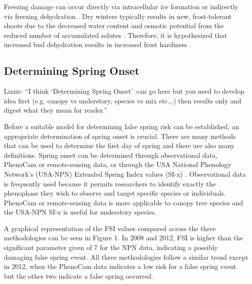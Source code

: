 \documentclass{article}\usepackage[]{graphicx}\usepackage[]{color}
\begin{document}
Freezing damage can occur directly via intracellular ice formation or indirectly via freezing dehydration \citep{Hofmann2015, Beck2004, Pearce2001}. Dry winters typically results in new, frost-tolerant shoots due to the decreased water content and osmotic potential from the reduced number of accumulated solutes \citep{Hofmann2015, Morin2007}. Therefore, it is hypothesized that increased bud dehydration results in increased frost hardiness \citep{Hofmann2015, Kathke2011, Poirier2010, Nielsen2009, Beck2007}.

\subsection*{Determining Spring Onset}
Lizzie: ``I think `Determining Spring Onset'\, can go here but you need to develop idea first (e.g. canopy vs understory, species vs mix etc...) then results only and digest what they mean for reader.''

Before a suitable model for determining false spring risk can be established, an appropriate determination of spring onset is crucial. There are many methods that can be used to determine the first day of spring and there are also many definitions. Spring onset can be determined through observational data, PhenoCam or remote-sensing data, or through the USA National Phenology Network's (USA-NPN) Extended Spring Index values (SI-x) \citep{USA-NPN2016}. Observational data is frequently used because it permits researchers to identify exactly the phenophase they wish to observe and target specific species or individuals. PhenoCam or remote-sensing data is more applicable to canopy tree species and the USA-NPN SI-x is useful for understory species.

A graphical representation of the FSI values compared across the three methodologies can be seen in Figure 1. In 2008 and 2012, FSI is higher than the significant parameter given of 7 for the NPN data, indicating a possibly damaging false spring event. All three methodologies follow a similar trend except in 2012, when the PhenoCam data indicates a low risk for a false spring event but the other two indicate a false spring occurred. 
\end{document}
